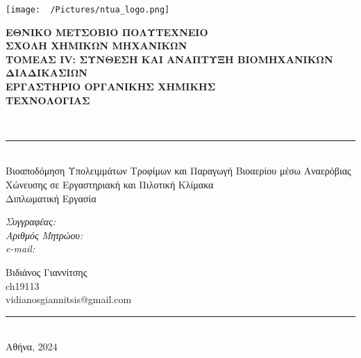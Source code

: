 \documentclass[11pt]{report}
\newcommand{\HRule}{\rule{\linewidth}{0.5mm}}
\begin{document}
\renewcommand{\contentsname}{Κεφάλαια: }
\begin{titlepage}

\begin{center}
  \begin{minipage}{0.2\textwidth}
    \begin{flushleft}
      \texttt{[image: ~/Pictures/ntua\_logo.png]}\\[0.4cm]    
    \end{flushleft}
  \end{minipage}
  \begin{minipage}{0.75\textwidth}
    \textsc{\bfseries \Large ΕΘΝΙΚΟ ΜΕΤΣΟΒΙΟ ΠΟΛΥΤΕΧΝΕΙΟ}\\[0.2cm]
    \textsc{\bfseries \Large ΣΧΟΛΗ ΧΗΜΙΚΩΝ ΜΗΧΑΝΙΚΩΝ}\\[0.2cm]
    \textsc{\large \bfseries ΤΟΜΕΑΣ IV: ΣΥΝΘΕΣΗ ΚΑΙ ΑΝΑΠΤΥΞΗ ΒΙΟΜΗΧΑΝΙΚΩΝ ΔΙΑΔΙΚΑΣΙΩΝ}\\[0.2cm]
    \textsc{\bfseries \large ΕΡΓΑΣΤΗΡΙΟ ΟΡΓΑΝΙΚΗΣ ΧΗΜΙΚΗΣ \\ ΤΕΧΝΟΛΟΓΙΑΣ}\\[0.2cm]
  \end{minipage}
  \\[2.5cm]

  \HRule \\[0.3cm]
  \Huge Βιοαποδόμηση Υπολειμμάτων Τροφίμων και Παραγωγή Βιοαερίου μέσω Αναερόβιας Χώνευσης σε Εργαστηριακή και Πιλοτική Κλίμακα\\[2.5cm]

  \huge Διπλωματική Εργασία \\[0.3cm]
   \begin{minipage}{0.4\textwidth}
    \begin{flushleft}
      \emph{\LARGE Συγγραφέας:}\\
	\emph{\LARGE Αριθμός Μητρώου:} \\
	\emph{\LARGE e-mail:}
      \end{flushleft}
    \end{minipage}
    \begin{minipage}{0.4\textwidth}
      \begin{flushright} \large
	\LARGE Βιδιάνος Γιαννίτσης\\
	\LARGE ch19113\\
	\LARGE vidianosgiannitsis@gmail.com
      \end{flushright}
    \end{minipage}
    \HRule \\[0.3cm]
  \vfill
{\LARGE Αθήνα, 2024}

\end{center}

\end{titlepage}
\end{document}
